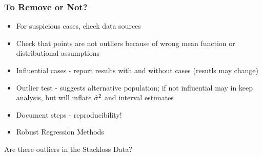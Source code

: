 \documentclass[]{beamer}
\begin{document}
  \begin{frame} \frametitle{To Remove or Not?}
    \begin{itemize}
    \item  For suspicious cases, check data sources  \pause
    \item  Check that points are not outliers because of wrong mean
      function or distributional assumptions  \pause
   \item Influential cases - report results with and without cases
     (resutls may change)  \pause
   \item Outlier test - suggests alternative population; if not
     influential may in keep analysis, but will inflate ${\hat{\sigma}}^2$ and
     interval estimates   \pause
   \item Document steps - reproducibility!
   \item Robust Regression Methods  \pause
    \end{itemize}
Are there outliers in the Stackloss Data?
  \end{frame}
\end{document}
